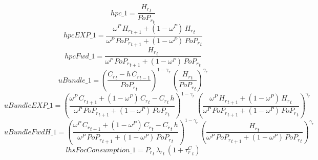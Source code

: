 \begin{dmath*}
hpc\_1 = \frac{{{H_r}}_{t}}{{{PoP_r}}_{t}}
\end{dmath*}
\begin{dmath*}
hpcEXP\_1 = \frac{{{\omega^{P}}}\, {{H_r}}_{t+1}+\left(1-{{\omega^{P}}}\right)\, {{H_r}}_{t}}{{{\omega^{P}}}\, {{PoP_r}}_{t+1}+\left(1-{{\omega^{P}}}\right)\, {{PoP_r}}_{t}}
\end{dmath*}
\begin{dmath*}
hpcFwd\_1 = \frac{{{H_r}}_{t}}{{{\omega^{P}}}\, {{PoP_r}}_{t+1}+\left(1-{{\omega^{P}}}\right)\, {{PoP_r}}_{t}}
\end{dmath*}
\begin{dmath*}
uBundle\_1 = \left(\frac{{{C_r}}_{t}-{{h}}\, {{C_r}}_{t-1}}{{{PoP_r}}_{t}}\right)^{1-{{\gamma_r}}}\, \left(\frac{{{H_r}}_{t}}{{{PoP_r}}_{t}}\right)^{{{\gamma_r}}}
\end{dmath*}
\begin{dmath*}
uBundleEXP\_1 = \left(\frac{{{\omega^{P}}}\, {{C_r}}_{t+1}+\left(1-{{\omega^{P}}}\right)\, {{C_r}}_{t}-{{C_r}}_{t}\, {{h}}}{{{\omega^{P}}}\, {{PoP_r}}_{t+1}+\left(1-{{\omega^{P}}}\right)\, {{PoP_r}}_{t}}\right)^{1-{{\gamma_r}}}\, \left(\frac{{{\omega^{P}}}\, {{H_r}}_{t+1}+\left(1-{{\omega^{P}}}\right)\, {{H_r}}_{t}}{{{\omega^{P}}}\, {{PoP_r}}_{t+1}+\left(1-{{\omega^{P}}}\right)\, {{PoP_r}}_{t}}\right)^{{{\gamma_r}}}
\end{dmath*}
\begin{dmath*}
uBundleFwdH\_1 = \left(\frac{{{\omega^{P}}}\, {{C_r}}_{t+1}+\left(1-{{\omega^{P}}}\right)\, {{C_r}}_{t}-{{C_r}}_{t}\, {{h}}}{{{\omega^{P}}}\, {{PoP_r}}_{t+1}+\left(1-{{\omega^{P}}}\right)\, {{PoP_r}}_{t}}\right)^{1-{{\gamma_r}}}\, \left(\frac{{{H_r}}_{t}}{{{\omega^{P}}}\, {{PoP_r}}_{t+1}+\left(1-{{\omega^{P}}}\right)\, {{PoP_r}}_{t}}\right)^{{{\gamma_r}}}
\end{dmath*}
\begin{dmath*}
lhsFocConsumption\_1 = {{P_{r}}}_{t}\, {\lambda_r}_{t}\, \left(1+{{\tau^{C}_{r}}}_{t}\right)
\end{dmath*}
